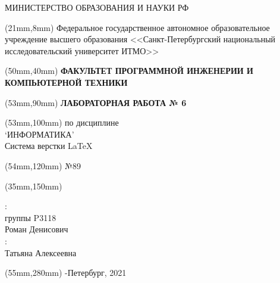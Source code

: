 
    \begin{center}

        МИНИСТЕРСТВО ОБРАЗОВАНИЯ И НАУКИ РФ \\
        \begin{textblock*}{160mm}(21mm,8mm)%
	        \Large Федеральное государственное автономное образовательное учреждение высшего образования <<Санкт-Петербургский национальный исследовательский университет ИТМО>>
	    \end{textblock*}
	    

	    \begin{textblock*}{100mm}(50mm,40mm)
	        \Large\textbf{ФАКУЛЬТЕТ ПРОГРАММНОЙ ИНЖЕНЕРИИ И КОМПЬЮТЕРНОЙ ТЕХНИКИ}
	    \end{textblock*}
	    

	    \begin{textblock*}{100mm}(53mm,90mm)
	        \Large\textbf{ЛАБОРАТОРНАЯ РАБОТА № 6}
	    \end{textblock*}

         \begin{textblock*}{100mm}(53mm,100mm)
	        \Large по дисциплине\\
            \Large ‘ИНФОРМАТИКА’\\
            \Large Система верстки \LaTeX 
	    \end{textblock*}

	    \begin{textblock*}{100mm}(54mm,120mm)
	         №89
	    \end{textblock*}
        
    
    \begin{textblock*}{150mm}(35mm,150mm)
    \begin{flushright}
        :\\
	     группы P3118\\
	     Роман Денисович\\
        :\\
         Татьяна Алексеевна
    \end{flushright}
	\end{textblock*}

    
    \begin{textblock*}{100mm}(55mm,280mm)
    -Петербург, 2021 
	\end{textblock*}
	\end{center}


